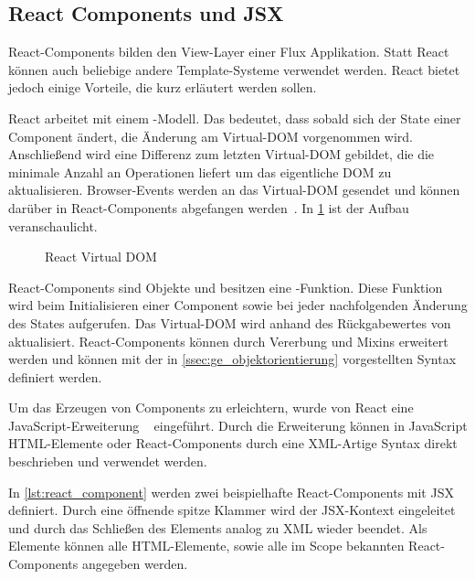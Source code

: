 \subsection{React Components und JSX}
\label{ssec:gf_react_components_und_jsx}

React-Components bilden den View-Layer einer Flux Applikation.  Statt React
können auch beliebige andere Template-Systeme verwendet werden.  React bietet
jedoch einige Vorteile, die kurz erläutert werden sollen.

React arbeitet mit einem -Modell.  Das bedeutet,
dass sobald sich der State einer Component ändert, die Änderung am Virtual-DOM
vorgenommen wird.  Anschließend wird eine Differenz zum letzten Virtual-DOM
gebildet, die die minimale Anzahl an Operationen liefert um das eigentliche DOM
zu aktualisieren.  Browser-Events werden an das Virtual-DOM gesendet und können
darüber in React-Components abgefangen werden~\cite{ReactDemystified}.
In \cref{fig:react_virtual_dom} ist der Aufbau veranschaulicht.

\begin{figure}
    \centering
    
    \caption{React Virtual DOM}
    \label{fig:react_virtual_dom}
\end{figure}

React-Components sind Objekte und besitzen eine -Funktion.  Diese
Funktion wird beim Initialisieren einer Component sowie bei jeder nachfolgenden
Änderung des States aufgerufen.  Das Virtual-DOM wird anhand des Rückgabewertes
von  aktualisiert.  React-Components können durch Vererbung und
Mixins erweitert werden und können mit der in
\cref{ssec:ge_objektorientierung} vorgestellten Syntax definiert werden.

Um das Erzeugen von Components zu erleichtern, wurde von React eine
JavaScript-Erweiterung ~\cite{JSX} eingeführt.  Durch die
Erweiterung können in JavaScript HTML-Elemente oder React-Components durch
eine XML-Artige Syntax direkt beschrieben und verwendet werden.

In \cref{lst:react_component} werden zwei beispielhafte React-Components mit JSX
definiert.  Durch eine öffnende spitze Klammer wird der JSX-Kontext eingeleitet
und durch das Schließen des Elements analog zu XML wieder beendet.  Als Elemente
können alle HTML-Elemente, sowie alle im Scope bekannten React-Components
angegeben werden.




